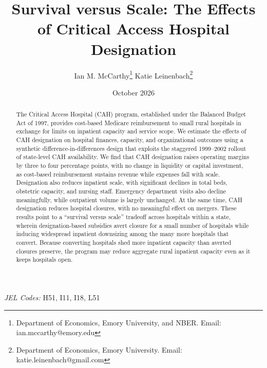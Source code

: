 \documentclass[a4paper, 12pt, twoside]{article}
\begin{document}
\thispagestyle{empty}

\title{
\vspace{-1.5cm}\Huge
Survival versus Scale: The Effects of Critical Access Hospital Designation
}


\author{
\large Ian M. McCarthy\footnote{\scriptsize Department of Economics, Emory University, and NBER. Email: ian.mccarthy@emory.edu} \hspace{0.2cm} \large Katie Leinenbach\footnote{\scriptsize Department of Economics, Emory University. Email: katie.leinenbach@gmail.com} }
\date{October 2026}
\maketitle

\onehalfspace

\begin{abstract}
\noindent The Critical Access Hospital (CAH) program, established under the Balanced Budget Act of 1997, provides cost-based Medicare reimbursement to small rural hospitals in exchange for limits on inpatient capacity and service scope. We estimate the effects of CAH designation on hospital finances, capacity, and organizational outcomes using a synthetic difference-in-differences design that exploits the staggered 1999--2002 rollout of state-level CAH availability. We find that CAH designation raises operating margins by three to four percentage points, with no change in liquidity or capital investment, as cost-based reimbursement sustains revenue while expenses fall with scale. Designation also reduces inpatient scale, with significant declines in total beds, obstetric capacity, and nursing staff. Emergency department visits also decline meaningfully, while outpatient volume is largely unchanged. At the same time, CAH designation reduces hospital closures, with no meaningful effect on mergers. These results point to a ``survival versus scale'' tradeoff across hospitals within a state, wherein designation-based subsidies avert closure for a small number of hospitals while inducing widespread inpatient downsizing among the many more hospitals that convert. Because converting hospitals shed more inpatient capacity than averted closures preserve, the program may reduce aggregate rural inpatient capacity even as it keeps hospitals open.
\end{abstract}

\bigskip

\noindent \textit{JEL Codes:} H51, I11, I18, L51
\end{document}
